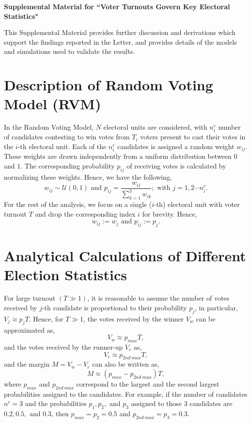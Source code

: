 \documentclass[reprint, pre, twocolumn, aps, showpacs, superscriptaddress]{revtex4-2}
\begin{document}
\onecolumngrid
\newpage
\begin{center}
\textbf{\large Supplemental Material for ``Voter Turnouts Govern Key Electoral Statistics"}
\end{center}
% 

This Supplemental Material provides further discussion and derivations which support the findings reported in the Letter, and provides details of the models and simulations used to validate the results. 

\tableofcontents

\section{Description of Random Voting Model (RVM)}
\label{sec:1}
\noindent In the Random Voting Model, $N$ electoral units are considered, with $n^c_i$ number of candidates contesting to win votes from $T_i$ voters present to cast their votes in the $i$-th electoral unit. Each of the $n^c_i$ candidates is assigned a random weight $w_{ij}$. These weights are drawn independently from a uniform distribution between $0$ and $1$. The corresponding probability $p_{ij}$ of receiving votes is calculated by normalizing these weights. Hence, we have the following,
\begin{equation}
    w_{ij} \sim \mathcal{U}(0, 1) \text{ and } p_{ij} = \frac{w_{ij}}{\sum_{k=1}^3 w_{ik}}; \text{ with } j = 1, 2\cdots n^c_i.
    \label{eq:prob-def}
\end{equation}
For the rest of the analysis, we focus on a single ($i$-th) electoral unit with voter turnout $T$ and drop the corresponding index $i$ for brevity. Hence,
\begin{equation}
    w_{ij} := w_j \text{ and } p_{ij} := p_j.
\end{equation}

\section{Analytical Calculations of Different Election Statistics}
\noindent For large turnout $(T \gg 1)$, it is reasonable to assume the number of votes received by $j$-th candidate is proportional to their probability $p_j$, in particular, $V_j \approx p_j T$. Hence, for $T \gg 1$, the votes received by the winner  $V_w$ can be approximated as,
\begin{equation}
V_w \approx p_{max}T,
\end{equation}
and the votes received by the runner-up $V_r$ as,
\begin{equation}
V_r \approx p_{2nd\:max}T,
\end{equation}
and the margin $M = V_w - V_r$ can also be written as,
\begin{equation}
M \approx \left( p_{max} - p_{2nd\:max}\right)T,
\end{equation}
where $p_{max}$ and $p_{2nd \:max}$ correspond to the largest and the second largest probabilities assigned to the candidates. For example, if the number of candidates $n^c = 3$ and the probabilities $p_1, p_2,$ and $p_3$ assigned to those 3 candidates are $0.2, 0.5,$ and $0.3$, then $p_{max} = p_2 = 0.5$ and $p_{2nd \:max} = p_3 = 0.3$. 
\end{document}
